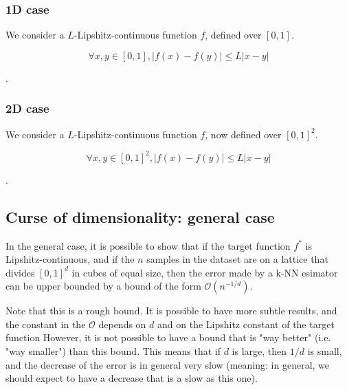 \documentclass[
10pt, %
a4paper, %
oneside, %
headinclude,footinclude, %
BCOR5mm, %
]{scrartcl}
\begin{document}
\subsubsection{1D case}

We consider a $L$-Lipshitz-continuous function $f$, defined over $[0,1]$.

\begin{equation}
    \forall x,y\in [0,1], |f(x)-f(y)|\leq L|x-y|
\end{equation}

{}.

\subsubsection{2D case}

We consider a $L$-Lipshitz-continuous function $f$, now defined over $[0,1]^2$.

\begin{equation}
    \forall x,y\in [0,1]^2, |f(x)-f(y)|\leq L|x-y|
\end{equation}

{}.

\subsection{Curse of dimensionality: general case}



In the general case, it is possible to show that if the target function $f^*$ is Lipshitz-continuous,
and if the $n$ samples in the dataset are on a lattice that divides $[0, 1]^d$ in
cubes of equal size, then the error made by a k-NN esimator can be upper bounded by a bound of the form $\mathcal{O}( n^{-1/d})$. 

Note that this is a rough bound. It is possible to have more subtle results,
and the constant in the $ \mathcal{O} $ depends on $d$ and on the Lipshitz
constant of the target function However, it is
not possible to have a bound that is "way better" (i.e. "way smaller") than
this bound. This means that if $d$ is large, then $1/d$ is small, and the decrease of the
error is in general very slow (meaning: in general, we should expect to have a decrease that is a slow as this one).
\end{document}
